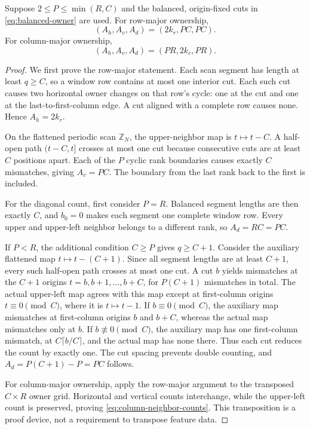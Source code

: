 \begin{lemma}
\label{lem:balanced-neighbor-counts}
Suppose $2\le P\le\min(R,C)$ and the balanced, origin-fixed cuts in
\eqref{eq:balanced-owner} are used. For row-major ownership,
\begin{equation}
 (A_h,A_v,A_d)=(2k_r,PC,PC).
 \label{eq:row-neighbor-counts}
\end{equation}
For column-major ownership,
\begin{equation}
 (A_h,A_v,A_d)=(PR,2k_c,PR).
 \label{eq:column-neighbor-counts}
\end{equation}
\end{lemma}
\begin{proof}
We first prove the row-major statement. Each scan segment has length at
least $q\ge C$, so a window row contains at most one interior cut.
Each such cut causes two horizontal owner changes on that row's cycle:
one at the cut and one at the last-to-first-column edge.
A cut aligned with a complete row causes none. Hence $A_h=2k_r$.

On the flattened periodic scan $\mathbb Z_N$, the upper-neighbor map is
$t\mapsto t-C$. A half-open path $(t-C,t]$ crosses at most one cut because
consecutive cuts are at least $C$ positions apart. Each of the $P$ cyclic
rank boundaries causes exactly $C$ mismatches, giving $A_v=PC$.
The boundary from the last rank back to the first is included.

For the diagonal count, first consider $P=R$. Balanced segment lengths
are then exactly $C$, and $b_0=0$ makes each segment one complete window
row. Every upper and upper-left neighbor belongs to a different rank,
so $A_d=RC=PC$.

If $P<R$, the additional condition $C\ge P$ gives $q\ge C+1$.
Consider the auxiliary flattened map $t\mapsto t-(C+1)$.
Since all segment lengths are at least $C+1$, every such half-open path
crosses at most one cut. A cut $b$ yields mismatches at the $C+1$ origins
$t=b,b+1,\ldots,b+C$, for $P(C+1)$ mismatches in total.
The actual upper-left map agrees with this map except at first-column
origins $t\equiv0\pmod C$, where it is $t\mapsto t-1$.
If $b\equiv0\pmod C$, the auxiliary map mismatches at first-column origins
$b$ and $b+C$, whereas the actual map mismatches only at $b$.
If $b\not\equiv0\pmod C$, the auxiliary map has one first-column mismatch,
at $C\lceil b/C\rceil$, and the actual map has none there.
Thus each cut reduces the count by exactly one. The cut spacing prevents
double counting, and $A_d=P(C+1)-P=PC$ follows.

For column-major ownership, apply the row-major argument to the transposed
$C\times R$ owner grid. Horizontal and vertical counts interchange, while
the upper-left count is preserved, proving \eqref{eq:column-neighbor-counts}.
This transposition is a proof device, not a requirement to transpose feature data.
\end{proof}

